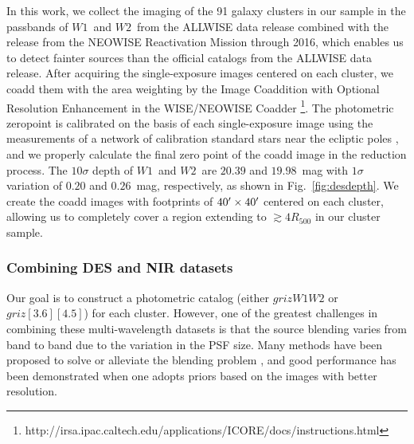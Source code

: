 \documentclass[useAMS,usenatbib,iop,numberedappendix]{mn2e}
\newcommand{\Rfiveoo}{\ensuremath{R_{500}}}
\newcommand{\IRACone}{\ensuremath{[3.6]}}
\newcommand{\IRACtwo}{\ensuremath{[4.5]}}
\newcommand{\Wone}{\ensuremath{W1}}
\newcommand{\Wtwo}{\ensuremath{W2}}
\begin{document}
In this work, we collect the imaging of the 91 galaxy clusters in our sample in the passbands of \Wone\ and \Wtwo\ from the ALLWISE data release combined with the release from the NEOWISE Reactivation Mission through 2016, which enables us to detect fainter sources than the official catalogs from the ALLWISE data release.  After acquiring the single-exposure images centered on each cluster,  we coadd them with the area weighting by the Image Coaddition with Optional Resolution Enhancement \citep[ICORE; ][]{masci09} in the WISE/NEOWISE Coadder \footnote{http://irsa.ipac.caltech.edu/applications/ICORE/docs/instructions.html}. The photometric zeropoint is calibrated on the basis of each single-exposure image using the measurements of a network of calibration standard stars near the ecliptic poles \citep[see more details in][]{wright10,jarrett11}, and we properly calculate the final zero point of the coadd image in the reduction process.
The $10\sigma$ depth of \Wone\ and \Wtwo\ are $20.39$ and $19.98$~mag with $1\sigma$ variation of $0.20$ and $0.26$~mag, respectively, as shown in Fig.~\ref{fig:desdepth}. 
We create the coadd images with footprints of $40\hbox{$^\prime$}\times40\hbox{$^\prime$}$ centered on each cluster, allowing us to completely cover a region extending to $\gtrsim4\Rfiveoo$ in our cluster sample. 

\subsubsection{Combining DES and NIR datasets}
\label{sec:deblending}

Our goal is to construct a photometric catalog (either $griz\Wone\Wtwo$ or $griz\IRACone\IRACtwo$) for each cluster. 
However, one of the greatest challenges in combining these multi-wavelength datasets is that the source blending varies from band to band due to the variation in the PSF size.  Many methods have been proposed to solve or alleviate the blending problem \citep[e.g., ][]{laidler07,desantis2007,mancone13,joseph2016,laigle16}, and good performance has been demonstrated when one adopts priors based on the images with better resolution. 
\end{document}
